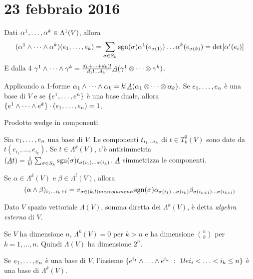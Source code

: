 \chapter{23 febbraio 2016}

\begin{remark}
	Dati $\seqa{\alpha}{k}{,}\in\Lambda^1(V)$, allora
	\begin{equation*}
		(\seqa{\alpha}{k}{\wedge})(\seqb{e}{k}{,}) = \sum_{\sigma\in S_k} \sgn(\sigma) \alpha^1(e_{\sigma(1)}) \ldots \alpha^k(e_{\sigma(k)}) = \det[\alpha^i(e_i)]
	\end{equation*}
	E dalla 4 $\seqa{\gamma}{k}{\wedge} = \frac{\seqb{d}{k}{+})!}{d_1!\ldots d_k!}\antisimm (\seqa{\gamma}{k}{\otimes})$.
	
	Applicando a 1-forme $\seqb{\alpha}{k}{\wedge} = k! \antisimm(\seqb{\alpha}{k}{\otimes})$.
	Se $\seqb en,$ è una base di $V$ e se $\{\seqa en,\}$ è una base duale, allora $\{\seqa ek\wedge \}\cdot (\seqb en,) = 1$.

\end{remark}

Prodotto wedge in componenti

Sia $\seqb en,$ una base di $V$. Le componenti $t_{\seqb ik{}}$ di $t\in T^0_k(V)$ sono date da $t(e_{i_1},\ldots,e_{i_k})$.
Se $t\in\Lambda^k(V)$, c'è antisimmetria $(\antisimm t) = \frac 1{k!} \sum_{\sigma\in S_k} \sgn(\sigma) t_{\sigma(i_1)\ldots\sigma(i_k)}$. $\antisimm$ simmetrizza le componenti.

Se $\alpha\in\Lambda^k(V)$ e $\beta\in\Lambda^l(V)$, allora
\begin{equation*}
	(\alpha\wedge\beta)_{\seqb{i}{k+l}{}} = \sigma_{\sigma\in(k,l) mescolamenti} \sgn(\sigma) \alpha_{\sigma(i_1)\ldots\sigma(i_k)} \beta_{\sigma(i_{k+1})\ldots\sigma(i_{k+l})}
\end{equation*}

\begin{definition}
	Dato $V$ spazio vettoriale $\Lambda(V)$, somma diretta dei $\Lambda^k(V)$, è detta \emph{algebra esterna} di $V$.
\end{definition}

\begin{proposition}
	Se $V$ ha dimensione $n$, $\Lambda^k(V)=0$ per $k>n$ e ha dimensione $\binom nk$ per $k=1,\ldots,n$. Quindi $\Lambda(V)$ ha dimensione $2^n$.
	
	Se $\seqb en,$ è una base di $V$, l'insieme $\{ e^{i_1}\wedge\ldots\wedge e^{i_k} \suchthat 1le i_i< \ldots < i_k\le n\}$ è una base di $\Lambda^k(V)$.
\end{proposition}

